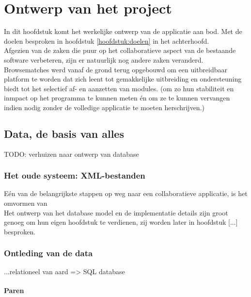 \chapter{Ontwerp van het project}
\label{hoofdstuk:ontwerp}

In dit hoofdstuk komt het werkelijke ontwerp van de applicatie aan bod. Met de doelen besproken in hoofdstuk \ref{hoofdstuk:doelen} in het achterhoofd.\\ 

Afgezien van de zaken die puur op het collaboratieve aspect van de bestaande software verbeteren, zijn er natuurlijk nog andere zaken veranderd.\\

Browsematches werd vanaf de grond terug opgebouwd om een uitbreidbaar platform te worden dat zich leent tot gemakkelijke uitbreiding en ondersteuning biedt tot het selectief af- en aanzetten van modules.
(om zo hun stabiliteit en inmpact op het programma te kunnen meten \'en om ze te kunnen vervangen indien nodig zonder de volledige applicatie te moeten herschrijven.)\\

\section{Data, de basis van alles}
TODO: verhuizen naar ontwerp van database

\subsection{Het oude systeem: XML-bestanden}

E\'en van de belangrijkste stappen op weg naar een collaboratieve applicatie, is het omvormen van\\

Het ontwerp van het database model en de implementatie details zijn groot genoeg om hun eigen hoofdstuk te verdienen, zij worden later in hoofdstuk [...] besproken.\\

\subsection{Ontleding van de data}
...relationeel van aard => SQL database

\subsubsection{Paren}

